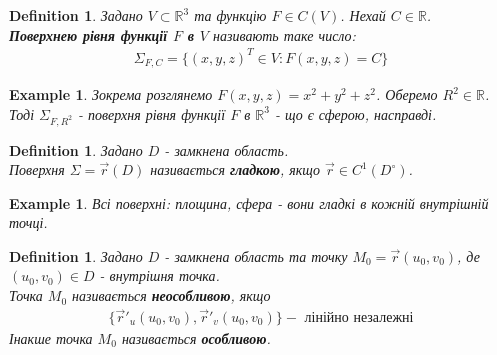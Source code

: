 \documentclass[a4paper, 10pt]{article}
\theoremstyle{theoremdd}
\theoremstyle{theoremdd}
\newtheorem{definition}[theorem]{Definition}
\theoremstyle{theoremdd}
\theoremstyle{theoremdd}
\theoremstyle{theoremdd}
\newtheorem{example}[theorem]{Example}
\theoremstyle{theoremdd}
\theoremstyle{theoremdd}
\theoremstyle{theoremdd}
\theoremstyle{theoremdd}
\theoremstyle{theoremdd}
\theoremstyle{theoremdd}
\theoremstyle{theoremdd}
\theoremstyle{theoremdd}
\theoremstyle{theoremdd}
\theoremstyle{theoremdd}
\begin{document}
\begin{definition}
Задано $V \subset \mathbb{R}^3$ та функцію $F \in C(V)$. Нехай $C \in \mathbb{R}$.\\
\textbf{Поверхнею рівня функції $F$ в $V$} називають таке число:
\begin{align*}
\Sigma_{F,C} = \{ (x,y,z)^T \in V: F(x,y,z) = C\}
\end{align*}
\end{definition}

\begin{example}
Зокрема розглянемо $F(x,y,z) = x^2+y^2+z^2$. Оберемо $R^2 \in \mathbb{R}$.\\
Тоді $\Sigma_{F,R^2}$ - поверхня рівня функції $F$ в $\mathbb{R}^3$ - що є сферою, насправді.
\end{example}

\begin{definition}
Задано $D$ - замкнена область.\\
Поверхня $\Sigma = \vec{r}(D)$ називається \textbf{гладкою}, якщо $\vec{r} \in C^1(D^\circ)$.
\end{definition}

\begin{example}
Всі поверхні: площина, сфера - вони гладкі в кожній внутрішній точці.
\end{example}

\begin{definition}
Задано $D$ - замкнена область та точку $M_0 = \vec{r}(u_0,v_0)$, де $(u_0,v_0) \in D$ - внутрішня точка.\\
Точка $M_0$ називається \textbf{неособливою}, якщо
\begin{align*}
\{ \vec{r}'_u(u_0,v_0), \vec{r}'_v(u_0,v_0) \} - \text{ лінійно незалежні}
\end{align*}
Інакше точка $M_0$ називається \textbf{особливою}.
\end{definition}
\end{document}
